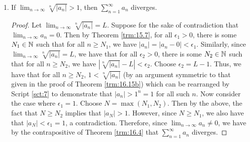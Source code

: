 \documentclass[../main.tex]{subfiles}
\begin{document}
\begin{theorem}
\begin{enumerate}[label={\textup{(}\alph*\textup{)}}]
\begin{proof}
            Let $\lim_{n\to\infty}\sqrt[n]{|a_n|}=L$. To prove that $\sum_{n=1}^\infty a_n$ converges, Theorem \ref{trm:16.13} tells us that that it will suffice to find a sequence $(c_n)$ of positive numbers such that $|a_n|\leq c_n$ for all $n\geq N_0$, where $N_0$ is some fixed integer, for which $\sum_{n=1}^\infty c_n$ converges. Since $L<1$ by hypothesis and $0<1$ by Corollary \ref{cly:7.27}, Theorem \ref{trm:5.2} asserts that there exists a point $x\in\R$ such that $\max(0,L)<x<1$. We now define $(c_n)$ by $c_n=x^n$ for all $n\in\N$. By Script \ref{sct:7} and the fact that $x\geq 0$, we know that $(c_n)$ is a sequence of positive numbers. Additionally, since $x-L>0$, Theorem \ref{trm:15.7} implies that there is some $N_0\in\N$ such that for all $n\geq N_0$, $|\sqrt[n]{|a_n|}-L|<x-L$. It follows by Script \ref{sct:7} that $|a_n|\leq x^n=c_n$ for all $n\geq N_0$. Lastly, since $-1<\max(0,L)<x<1$, we have by Theorem \ref{trm:16.7} that $\sum_{n=0}^\infty c_n$ converges. It follows by Lemma \ref{lem:16.2} that $\sum_{n=1}^\infty c_n$ converges, as desired.
        \end{proof}
        \item If $\lim_{n\to\infty}\sqrt[n]{|a_n|}>1$, then $\sum_{n=1}^\infty a_n$ diverges.
        \begin{proof}
            Let $\lim_{n\to\infty}\sqrt[n]{|a_n|}=L$. Suppose for the sake of contradiction that $\lim_{n\to\infty}a_n=0$. Then by Theorem \ref{trm:15.7}, for all $\epsilon_1>0$, there is some $N_1\in\mathbb{N}$ such that for all $n\geq N_1$, we have $|a_n|=|a_n-0|<\epsilon_1$. Similarly, since $\lim_{n\to\infty}\sqrt[n]{|a_n|}=L$, we have that for all $\epsilon_2>0$, there is some $N_2\in\mathbb{N}$ such that for all $n\geq N_2$, we have $|\sqrt[n]{|a_n|}-L|<\epsilon_2$. Choose $\epsilon_2=L-1$. Thus, we have that for all $n\geq N_2$, $1<\sqrt[n]{|a_n|}$ (by an argument symmetric to that given in the proof of Theorem \ref{trm:16.15b}) which can be rearranged by Script \ref{sct:7} to demonstrate that $|a_n|>1^n=1$ for all such $n$. Now consider the case where $\epsilon_1=1$. Choose $N=\max(N_1,N_2)$. Then by the above, the fact that $N\geq N_2$ implies that $|a_N|>1$. However, since $N\geq N_1$, we also have that $|a_N|<\epsilon_1=1$, a contradiction. Therefore, since $\lim_{n\to\infty}a_n\neq 0$, we have by the contrapositive of Theorem \ref{trm:16.4} that $\sum_{n=1}^\infty a_n$ diverges.
        \end{proof}
    \end{enumerate}
\end{theorem}
\end{document}
